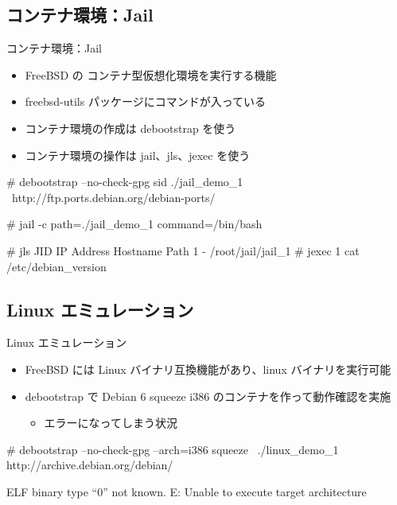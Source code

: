 \subsection{コンテナ環境：Jail}
\begin{frame}[containsverbatim]{コンテナ環境：Jail}

\begin{itemize}
\item FreeBSD の コンテナ型仮想化環境を実行する機能
\item freebsd-utils パッケージにコマンドが入っている
\item コンテナ環境の作成は debootstrap を使う
\item コンテナ環境の操作は jail、jls、jexec を使う
\end{itemize}

\begin{commandlinesmall}
# debootstrap --no-check-gpg sid ./jail_demo_1 \
http://ftp.ports.debian.org/debian-ports/
\end{commandlinesmall}

\begin{commandlinesmall}
# jail -c path=./jail_demo_1 command=/bin/bash
\end{commandlinesmall}

\begin{commandlinesmall}
# jls
JID  IP Address    Hostname  Path
  1  -                       /root/jail/jail_1
# jexec 1 cat /etc/debian_version
\end{commandlinesmall}

\end{frame}
  
\subsection{Linux エミュレーション}
\begin{frame}[containsverbatim]{Linux エミュレーション}
  \begin{itemize}
  \item FreeBSD には Linux バイナリ互換機能があり、linux バイナリを実行可能
  \item debootstrap で Debian 6 squeeze i386 のコンテナを作って動作確認を実施
    \begin{itemize}
    \item エラーになってしまう状況
    \end{itemize}
  \end{itemize}

\begin{commandlinesmall}
# debootstrap --no-check-gpg --arch=i386 squeeze \
./linux_demo_1 http://archive.debian.org/debian/

ELF binary type ``0'' not known.
E: Unable to execute target architecture
\end{commandlinesmall}

\end{frame}

